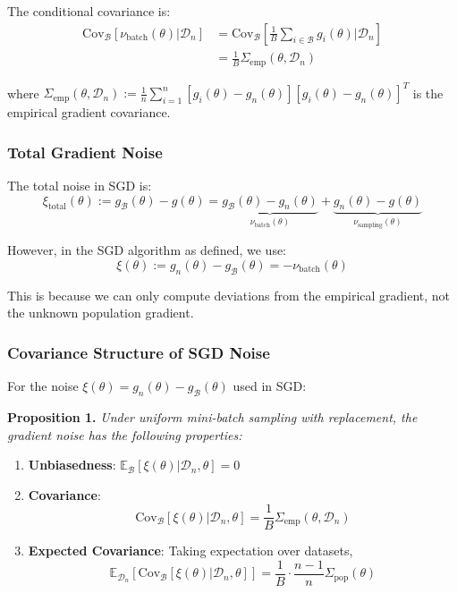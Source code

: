 \documentclass[11pt]{article}
\begin{document}
The conditional covariance is:
\begin{align}
\text{Cov}_{\mathcal{B}}[\nu_{\text{batch}}(\theta) | \mathcal{D}_n] &= \text{Cov}_{\mathcal{B}}\left[\frac{1}{B} \sum_{i \in \mathcal{B}} g_i(\theta) \bigg| \mathcal{D}_n\right] \\
&= \frac{1}{B} \Sigma_{\text{emp}}(\theta, \mathcal{D}_n)
\end{align}

where $\Sigma_{\text{emp}}(\theta, \mathcal{D}_n) := \frac{1}{n} \sum_{i=1}^n [g_i(\theta) - g_n(\theta)][g_i(\theta) - g_n(\theta)]^T$ is the empirical gradient covariance.

\subsubsection{Total Gradient Noise}

The total noise in SGD is:
$$\xi_{\text{total}}(\theta) := g_{\mathcal{B}}(\theta) - g(\theta) = \underbrace{g_{\mathcal{B}}(\theta) - g_n(\theta)}_{\nu_{\text{batch}}(\theta)} + \underbrace{g_n(\theta) - g(\theta)}_{\nu_{\text{sampling}}(\theta)}$$

However, in the SGD algorithm as defined, we use:
$$\xi(\theta) := g_n(\theta) - g_{\mathcal{B}}(\theta) = -\nu_{\text{batch}}(\theta)$$

This is because we can only compute deviations from the empirical gradient, not the unknown population gradient.

\subsubsection{Covariance Structure of SGD Noise}

For the noise $\xi(\theta) = g_n(\theta) - g_{\mathcal{B}}(\theta)$ used in SGD:

\textbf{Proposition 1.} \textit{Under uniform mini-batch sampling with replacement, the gradient noise has the following properties:}

\begin{enumerate}
    \item \textbf{Unbiasedness}: $\mathbb{E}_{\mathcal{B}}[\xi(\theta) | \mathcal{D}_n, \theta] = 0$
    
    \item \textbf{Covariance}: 
    $$\text{Cov}_{\mathcal{B}}[\xi(\theta) | \mathcal{D}_n, \theta] = \frac{1}{B} \Sigma_{\text{emp}}(\theta, \mathcal{D}_n)$$
    
    \item \textbf{Expected Covariance}: Taking expectation over datasets,
    $$\mathbb{E}_{\mathcal{D}_n}[\text{Cov}_{\mathcal{B}}[\xi(\theta) | \mathcal{D}_n, \theta]] = \frac{1}{B} \cdot \frac{n-1}{n} \Sigma_{\text{pop}}(\theta)$$
\end{enumerate}
\end{document}
